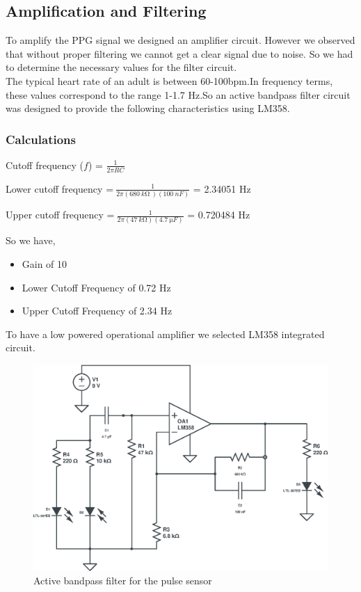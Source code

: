\documentclass[12pt]{article}
\begin{document}
		\subsection{Amplification and Filtering}
		
		To amplify the PPG signal we designed an amplifier circuit. However we observed that without proper filtering we cannot get a clear signal due to noise.
		So we had to determine the necessary values for the filter circuit.\\
		The typical heart rate of an adult is between 60-100bpm\cite{typical_pulse}.In frequency terms, these values correspond to the range 1-1.7 Hz.So an active bandpass filter circuit was designed to provide the following characteristics using LM358.


\subsubsection{Calculations}
\label{sec:4.2.1}
\begin{center}
	Cutoff frequency ($f$) = $\frac{1}{2\pi RC}$
	
	
	
	Lower cutoff frequency =$\ \frac{1}{2\pi ( 680\ k\si{\ohm}\ )( 100\ nF)}$ = 2.34051 Hz
	
	
	
	Upper cutoff frequency =$\ \frac{1}{2 \pi  ( 47\ k\si{\ohm})( 4.7\ \si{\micro}F)}$ = 0.720484 Hz
	\end{center}
	
	
	
	
	
	So we have,

		\begin{itemize}
			\item Gain of 10
			\item Lower Cutoff Frequency of 0.72 Hz
			\item Upper Cutoff Frequency of 2.34 Hz\\
		  \end{itemize}
		 To have a low powered operational amplifier we selected LM358 integrated circuit.
	
		\begin{figure}[!htbp]
			\includegraphics[width=\textwidth]{LM358-Bandpass}
			\caption{Active bandpass filter for the pulse sensor}
		\end{figure}
	
\end{document}
